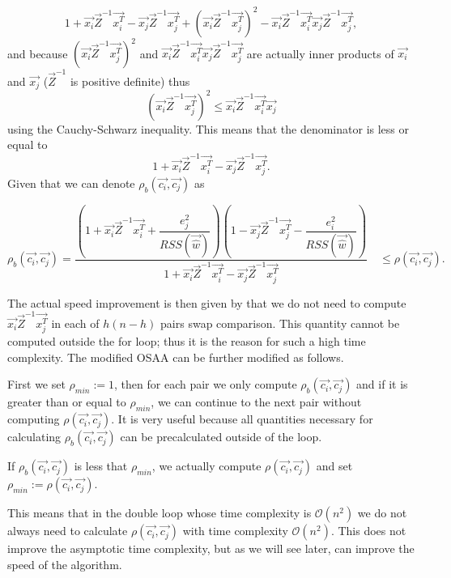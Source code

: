 \begin{equation}
    1 + \vec{x_i}\vec{Z}^{-1}\vec{x_i^T}  - \vec{x_j}\vec{Z}^{-1}\vec{x_j^T}  + (\vec{x_i}\vec{Z}^{-1}\vec{x_j^T})^2 -   \vec{x_i}\vec{Z}^{-1}\vec{x_i^T}\vec{x_j}\vec{Z}^{-1}\vec{x_j^T}, 
\end{equation}
and because $(\vec{x_i}\vec{Z}^{-1}\vec{x_j^T})^2$ and $\vec{x_i}\vec{Z}^{-1}\vec{x_i^T}\vec{x_j}\vec{Z}^{-1}\vec{x_j^T} $ are actually inner products of $\vec{x_i}$ and $\vec{x_j}$  ($\vec{Z}^{-1}$ is positive definite) thus
\begin{equation}
    (\vec{x_i}\vec{Z}^{-1}\vec{x_j^T})^2 \leq \vec{x_i}\vec{Z}^{-1}\vec{x_i^T}\vec{x_j}
\end{equation}
using the Cauchy-Schwarz inequality. This means that the denominator is less or equal to
\begin{equation}
    1 + \vec{x_i}\vec{Z}^{-1}\vec{x_i^T}  - \vec{x_j}\vec{Z}^{-1}\vec{x_j^T}.
\end{equation}
Given that we can denote $\rho_b(\vec{c_i}, \vec{c_j})$  as

\begin{equation} \label{boundingcondition}
\rho_b(\vec{c_i}, \vec{c_j}) = \dfrac{(1+\vec{x_i}\vec{Z}^{-1}\vec{x_i^T} + \dfrac{e_j^2}{RSS(\vec{\hat{w}})})
    (1 - \vec{x_j}\vec{Z}^{-1}\vec{x_j^T} - \dfrac{e_i^2}{RSS(\vec{\hat{w}})} )}{1 + \vec{x_i}\vec{Z}^{-1}\vec{x_i^T}  - \vec{x_j}\vec{Z}^{-1}\vec{x_j^T}} \quad \leq \rho(\vec{c_i}, \vec{c_j}).
\end{equation}

The actual speed improvement is then given by that we do not need to compute $\vec{x_i}\vec{Z}^{-1}\vec{x_j^T}$ in each of $h(n-h)$ pairs swap comparison. This quantity cannot be computed outside the for loop; thus it is the reason for such a high time complexity. The modified OSAA can be further modified as follows.

First we set $\rho_{min} :=1$, then for each pair we only compute $\rho_b(\vec{c_i}, \vec{c_j})$ and if it is greater than or equal to $\rho_{min}$, we can continue to the next pair without computing $\rho(\vec{c_i}, \vec{c_j})$. 
It is very useful because all quantities necessary for calculating $\rho_b(\vec{c_i}, \vec{c_j})$ can be precalculated outside of the loop.

If $\rho_b(\vec{c_i}, \vec{c_j})$ is less that  $\rho_{min}$, we actually compute $\rho(\vec{c_i}, \vec{c_j})$ and set $\rho_{min} := \rho(\vec{c_i}, \vec{c_j})$.

This means that in the double loop whose time complexity is $\mathcal{O}(n^2)$  we do not always need to calculate $\rho(\vec{c_i}, \vec{c_j})$ with time complexity $\mathcal{O}(n^2)$. This does not improve the asymptotic time complexity, but as we will see later, can improve the speed of the algorithm. 


